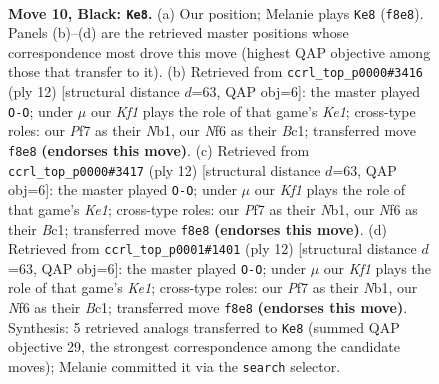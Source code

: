 \documentclass[11pt]{article}
\begin{document}
\clearpage

\begin{figure}[p]\centering
\begin{subfigure}{0.46\textwidth}\centering
\resizebox{\linewidth}{!}{%
\newchessgame
\chessboard[
  setfen={rnbq1kr1/pp2bppp/5n2/3p2N1/3P4/2N5/PP3PPP/R1BQKB1R b - - 3 10},
  showmover=false,
  pgfstyle=straightmove, color=movearrow, markmove={f8-e8}
]}
\caption{}
\end{subfigure}\hfill
\begin{subfigure}{0.46\textwidth}\centering
\resizebox{\linewidth}{!}{%
\newchessgame
\chessboard[
  setfen={r1bqkb1r/ppp2ppp/2n5/3p4/3Pn3/3B1N2/PPP2PPP/RNBQK2R w KQkq - 2 7},
  showmover=false,
  pgfstyle=straightmove, color=movearrow, markmove={e1-g1}
]}
\caption{}
\end{subfigure}
\\[4pt]
\begin{subfigure}{0.46\textwidth}\centering
\resizebox{\linewidth}{!}{%
\newchessgame
\chessboard[
  setfen={r1bqkb1r/ppp2ppp/2n5/3p4/3Pn3/3B1N2/PPP2PPP/RNBQK2R w KQkq - 2 7},
  showmover=false,
  pgfstyle=straightmove, color=movearrow, markmove={e1-g1}
]}
\caption{}
\end{subfigure}\hfill
\begin{subfigure}{0.46\textwidth}\centering
\resizebox{\linewidth}{!}{%
\newchessgame
\chessboard[
  setfen={r1bqkb1r/ppp2ppp/2n5/3p4/3Pn3/3B1N2/PPP2PPP/RNBQK2R w KQkq - 2 7},
  showmover=false,
  pgfstyle=straightmove, color=movearrow, markmove={e1-g1}
]}
\caption{}
\end{subfigure}
\caption{\textbf{Move 10, Black: \texttt{Ke8}.} (a) Our position; Melanie plays \texttt{Ke8} (\texttt{f8e8}). Panels (b)--(d) are the retrieved master positions whose correspondence most drove this move (highest QAP objective among those that transfer to it). (b) Retrieved from \texttt{ccrl\_top\_p0000\#3416} (ply 12) [structural distance $d$=63, QAP obj=6]: the master played \texttt{O-O}; under $\mu$ our \emph{Kf1} plays the role of that game's \emph{Ke1}; cross-type roles: our \emph{P}f7 as their \emph{N}b1, our \emph{N}f6 as their \emph{B}c1; transferred move \texttt{f8e8} \textbf{(endorses this move)}. (c) Retrieved from \texttt{ccrl\_top\_p0000\#3417} (ply 12) [structural distance $d$=63, QAP obj=6]: the master played \texttt{O-O}; under $\mu$ our \emph{Kf1} plays the role of that game's \emph{Ke1}; cross-type roles: our \emph{P}f7 as their \emph{N}b1, our \emph{N}f6 as their \emph{B}c1; transferred move \texttt{f8e8} \textbf{(endorses this move)}. (d) Retrieved from \texttt{ccrl\_top\_p0001\#1401} (ply 12) [structural distance $d$=63, QAP obj=6]: the master played \texttt{O-O}; under $\mu$ our \emph{Kf1} plays the role of that game's \emph{Ke1}; cross-type roles: our \emph{P}f7 as their \emph{N}b1, our \emph{N}f6 as their \emph{B}c1; transferred move \texttt{f8e8} \textbf{(endorses this move)}. Synthesis: 5 retrieved analogs transferred to \texttt{Ke8} (summed QAP objective 29, the strongest correspondence among the candidate moves); Melanie committed it via the \texttt{search} selector.}
\label{fig:thought-m19}
\end{figure}
\end{document}
